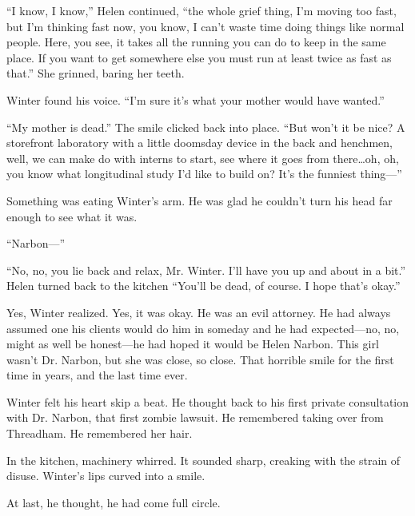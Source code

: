 \documentclass[ebook,10pt]{memoir}
\begin{document}
``I know, I know,'' Helen continued, ``the whole grief thing, I'm
moving too fast, but I'm thinking fast now, you know, I can't waste
time doing things like normal people. Here, you see, it takes all the
running you can do to keep in the same place. If you want to get
somewhere else you must run at least twice as fast as that.'' She
grinned, baring her teeth.

Winter found his voice. ``I'm sure it's what your mother would have
wanted.''

``My mother is dead.'' The smile clicked back into place. ``But won't
it be nice? A storefront laboratory with a little doomsday device in
the back and henchmen, well, we can make do with interns to start, see
where it goes from there\ldots oh, oh, you know what longitudinal study
I'd like to build on? It's the funniest thing---''

Something was eating Winter's arm. He was glad he couldn't turn his
head far enough to see what it was.

``Narbon---''

``No, no, you lie back and relax, Mr. Winter. I'll have you up and
about in a bit.'' Helen turned back to the kitchen ``You'll be dead,
of course. I hope that's okay.''

Yes, Winter realized. Yes, it was okay. He was an evil attorney. He
had always assumed one his clients would do him in someday and he had
expected---no, no, might as well be honest---he had hoped it would be
Helen Narbon. This girl wasn't Dr. Narbon, but she was close, so
close. That horrible smile for the first time in years, and the last
time ever.

Winter felt his heart skip a beat. He thought back to his first
private consultation with Dr. Narbon, that first zombie lawsuit. He
remembered taking over from Threadham. He remembered her hair.

In the kitchen, machinery whirred. It sounded sharp, creaking with the
strain of disuse. Winter's lips curved into a smile.

At last, he thought, he had come full circle.
\end{document}
